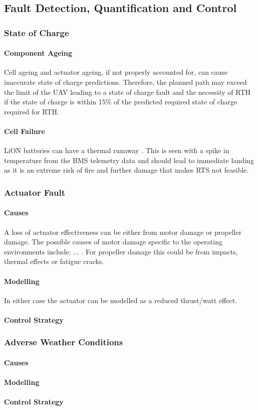\subsection{Fault Detection, Quantification and Control}

\subsubsection{State of Charge}
\paragraph{Component Ageing}
Cell ageing and actuator ageing, if not properly accounted for, can cause inaccurate state of charge predictions. Therefore, the planned path may exceed the limit of the \gls{UAV} leading to a state of charge fault and the necessity of \gls{RTH} if the state of charge is within 15\% of the predicted required state of charge required for \gls{RTH}.
\paragraph{Cell Failure}
\gls{LiON} batteries can have a thermal runaway \cite{REF}. This is seen with a spike in temperature from the \gls{BMS} telemetry data and should lead to immediate landing as it is an extreme risk of fire and further damage \cite{REF} that makes \gls{RTS} not feasible.

\subsubsection{Actuator Fault}
\paragraph{Causes}
A loss of actuator effectiveness can be either from motor damage or propeller damage. The possible causes of motor damage specific to the operating environments include: ... . For propeller damage this could be from impacts, thermal effects or fatigue cracks.
\paragraph{Modelling}
In either case the actuator can be modelled as a reduced thrust/watt effect.
\paragraph{Control Strategy}


\subsubsection{Adverse Weather Conditions}
\paragraph{Causes}
\paragraph{Modelling}
\paragraph{Control Strategy}